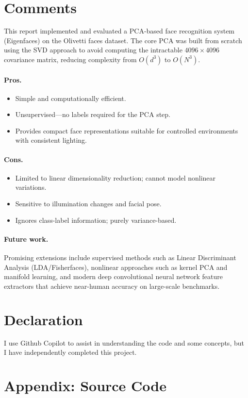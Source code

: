 \documentclass[a4paper,fleqn]{cas-sc}
\begin{document}
\section{Comments}

This report implemented and evaluated a PCA-based face recognition system (Eigenfaces) on the Olivetti faces dataset. The core PCA was built from scratch using the SVD approach to avoid computing the intractable $4096\times4096$ covariance matrix, reducing complexity from $O(d^3)$ to $O(N^3)$.

\paragraph{Pros.}
\begin{itemize}
    \item Simple and computationally efficient.
    \item Unsupervised---no labels required for the PCA step.
    \item Provides compact face representations suitable for controlled environments with consistent lighting.
\end{itemize}

\paragraph{Cons.}
\begin{itemize}
    \item Limited to linear dimensionality reduction; cannot model nonlinear variations.
    \item Sensitive to illumination changes and facial pose.
    \item Ignores class-label information; purely variance-based.
\end{itemize}

\paragraph{Future work.}
Promising extensions include supervised methods such as Linear Discriminant Analysis (LDA/Fisherfaces), nonlinear approaches such as kernel PCA and manifold learning, and modern deep convolutional neural network feature extractors that achieve near-human accuracy on large-scale benchmarks.

\section{Declaration}
I use Github Copilot to assist in understanding the code and some concepts, but I have independently completed this project.

\section*{Appendix: Source Code}


\printcredits

% 

% 
\end{document}
